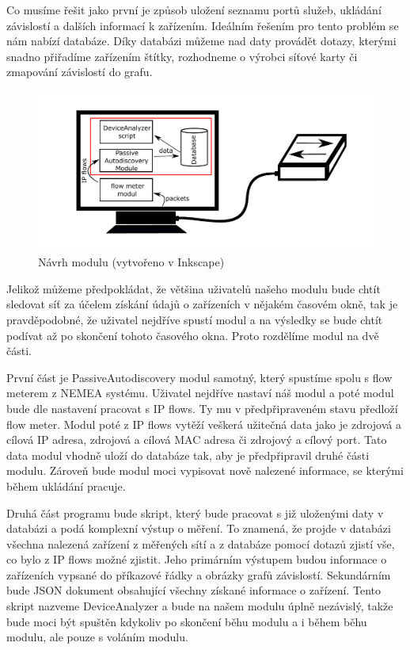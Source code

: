 \documentclass[thesis=B,czech,hidelinks]{FITthesis}[2019/03/21]
\begin{document}
    Co musíme řešit jako první je způsob uložení seznamu portů služeb, ukládání závislostí a dalších informací k zařízením. Ideálním řešením pro tento problém se nám nabízí databáze. Díky databázi můžeme nad daty provádět dotazy, kterými snadno přiřadíme zařízením štítky, rozhodneme o výrobci síťové karty či zmapování závislostí do grafu.
    
    \begin{figure}[h]
        \centering
        \includegraphics[width=\textwidth]{navrh.pdf}
        \caption[Návrh modulu]{Návrh modulu (vytvořeno v Inkscape)}
        \label{NavrhModulu}
    \end{figure}
    
    
    Jelikož můžeme předpokládat, že většina uživatelů našeho modulu bude chtít sledovat síť za účelem získání údajů o zařízeních v nějakém časovém okně, tak je pravděpodobné, že uživatel nejdříve spustí modul a na výsledky se bude chtít podívat až po skončení tohoto časového okna. Proto rozdělíme modul na dvě části.
    
    
    První část je PassiveAutodiscovery modul samotný, který spustíme spolu s flow meterem z NEMEA systému. Uživatel nejdříve nastaví náš modul a poté modul bude dle nastavení pracovat s IP flows. Ty mu v předpřipraveném stavu předloží flow meter. Modul poté z IP flows vytěží veškerá užitečná data jako je zdrojová a cílová IP adresa, zdrojová a cílová MAC adresa či zdrojový a cílový port. Tato data modul vhodně uloží do databáze tak, aby je předpřipravil druhé části modulu. Zároveň bude modul moci vypisovat nově nalezené informace, se kterými během ukládání pracuje.
    
    Druhá část programu bude skript, který bude pracovat s již uloženými daty v databázi a podá komplexní výstup o měření. To znamená, že projde v databázi všechna nalezená zařízení z měřených sítí a z databáze pomocí dotazů zjistí vše, co bylo z IP flows možné zjistit. Jeho primárním výstupem budou informace o zařízeních vypsané do příkazové řádky a obrázky grafů závislostí. Sekundárním bude JSON dokument obsahující všechny získané informace o zařízení. Tento skript nazveme DeviceAnalyzer a bude na našem modulu úplně nezávislý, takže bude moci být spuštěn kdykoliv po skončení běhu modulu a i během běhu modulu, ale pouze s voláním modulu.
    
\end{document}
